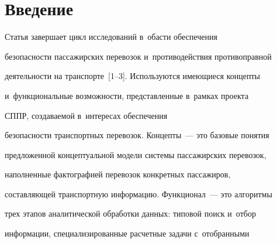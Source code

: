         

















 \thispagestyle{headings}


 


 \vspace*{-14pt}


        


\section{Введение}





\vspace*{-3pt}


      


      Статья завершает цикл исследований в~об\-асти обеспечения 


безопасности пассажирских перевозок и~противодействия противоправной 


деятельности на транспорте~[1--3]. Используются имеющиеся концепты 


и~функциональные возможности, представленные в~рамках проекта 


СППР, создаваемой в~интересах обеспечения 


безопасности транспортных перевозок. Концепты~--- это базовые понятия 


предложенной концептуальной модели системы пассажирских перевозок, 


наполненные фактографией перевозок конкретных пассажиров, 


составляющей транспортную информацию. Функционал~--- это алгоритмы 


трех этапов аналитической обработки данных: типовой поиск и~отбор 


информации, специализированные расчетные задачи с~отобранными 


